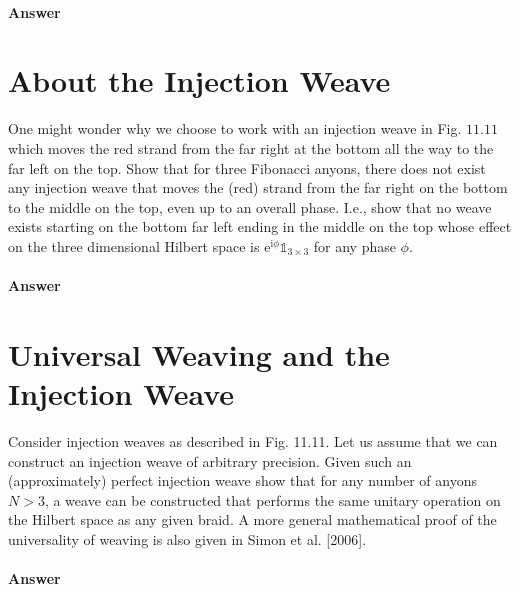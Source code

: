 \documentclass{book}
\begin{document}
\paragraph{Answer}

\section{About the Injection Weave}
One might wonder why we choose to work with an injection weave in Fig. $11.11$ which moves the red strand from the far right at the bottom all the way to the far left on the top. Show that for three Fibonacci anyons, there does not exist any injection weave that moves the (red) strand from the far right on the bottom to the middle on the top, even up to an overall phase. I.e., show that no weave exists starting on the bottom far left ending in the middle on the top whose effect on the three dimensional Hilbert space is $\mathrm{e}^{\mathrm{i} \phi }\mathds{1}_{3\times 3}$ for any phase $\phi $.

\paragraph{Answer}

\section{Universal Weaving and the Injection Weave}
Consider injection weaves as described in Fig. 11.11. Let us assume that we can construct an injection weave of arbitrary precision. Given such an (approximately) perfect injection weave show that for any number of anyons $N >3$, a weave can be constructed that performs the same unitary operation on the Hilbert space as any given braid. A more general mathematical proof of the universality of weaving is also given in Simon et al. [2006].

\paragraph{Answer}





\end{document}
